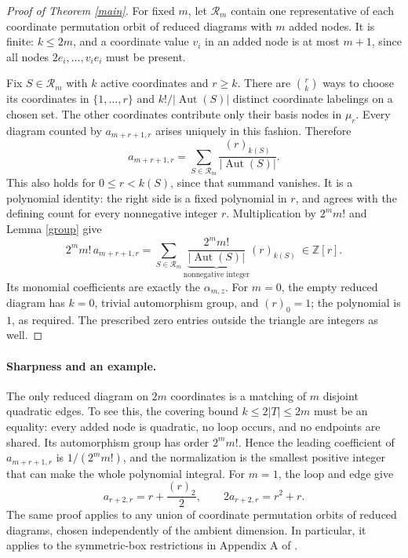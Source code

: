 \documentclass[11pt]{article}
\newcommand{\Aut}{\operatorname{Aut}}
\begin{document}
\begin{proof}[Proof of Theorem \ref{main}]
For fixed $m$, let $\mathcal R_m$ contain one representative of each coordinate
permutation orbit of reduced diagrams with $m$ added nodes. It is finite:
$k\leq2m$, and a coordinate value $v_i$ in an added node is at most $m+1$,
since all nodes $2e_i,\ldots,v_i e_i$ must be present.

Fix $S\in\mathcal R_m$ with $k$ active coordinates and $r\geq k$. There are
$\binom rk$ ways to choose its coordinates in $\{1,\ldots,r\}$ and
$k!/|\Aut(S)|$ distinct coordinate labelings on a chosen set. The other
coordinates contribute only their basis nodes in $\mu_r$. Every diagram
counted by $a_{m+r+1,r}$ arises uniquely in this fashion. Therefore
\begin{equation}\label{orbits}
 a_{m+r+1,r}=\sum_{S\in\mathcal R_m}\frac{(r)_{k(S)}}{|\Aut(S)|}.
\end{equation}
This also holds for $0\leq r<k(S)$, since that summand vanishes. It is a
polynomial identity: the right side is a fixed polynomial in $r$, and agrees
with the defining count for every nonnegative integer $r$.
Multiplication by $2^m m!$ and Lemma \ref{group} give
\[
 2^m m!\,a_{m+r+1,r}
 =\sum_{S\in\mathcal R_m}
 \underbrace{\frac{2^m m!}{|\Aut(S)|}}_{\text{nonnegative integer}}(r)_{k(S)}
 \ \in\mathbb Z[r].
\]
Its monomial coefficients are exactly the $\alpha_{m,z}$. For $m=0$, the
empty reduced diagram has $k=0$, trivial automorphism group, and $(r)_0=1$;
the polynomial is $1$, as required. The prescribed zero entries outside the
triangle are integers as well.
\end{proof}

\paragraph{Sharpness and an example.}
The only reduced diagram on $2m$ coordinates is a matching of $m$ disjoint
quadratic edges. To see this, the covering bound $k\leq2|T|\leq2m$ must be
an equality: every added node is quadratic, no loop occurs, and no endpoints
are shared. Its automorphism group has order $2^m m!$. Hence the leading
coefficient of $a_{m+r+1,r}$ is $1/(2^m m!)$, and the normalization is the
smallest positive integer that can make the whole polynomial integral.
For $m=1$, the loop and edge give
\[
 a_{r+2,r}=r+\frac{(r)_2}{2},\qquad
 2a_{r+2,r}=r^2+r.
\]
The same proof applies to any union of coordinate permutation orbits of
reduced diagrams, chosen independently of the ambient dimension. In particular,
it applies to the symmetric-box restrictions in Appendix A of \cite{G}.
\end{document}
